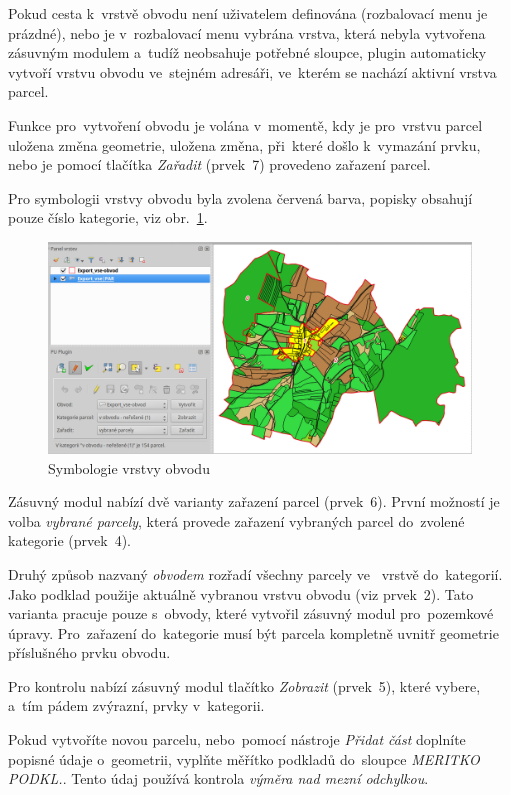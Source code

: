 Pokud cesta k~vrstvě obvodu není uživatelem definována (rozbalovací menu je prázdné), nebo je v~rozbalovací menu vybrána vrstva, která nebyla vytvořena zásuvným modulem a~tudíž neobsahuje potřebné sloupce, plugin automaticky vytvoří vrstvu obvodu ve~stejném adresáři, ve~kterém se nachází aktivní vrstva parcel.

Funkce pro~vytvoření obvodu je volána v~momentě, kdy je pro~vrstvu parcel uložena změna geometrie, uložena změna, při~které došlo k~vymazání prvku, nebo je pomocí tlačítka \textit{Zařadit} (prvek~7) provedeno zařazení parcel.

Pro symbologii vrstvy obvodu byla zvolena červená barva, popisky obsahují pouze číslo kategorie, viz obr.~\ref{fig:manual_symbologie_obvod}.

	\begin{figure}[H]
		\centering
		\includegraphics[width=1.0\textwidth]{./pictures/symbologie_obvod.png}
		\caption[Symbologie vrstvy obvodu]{Symbologie vrstvy obvodu}
		\label{fig:manual_symbologie_obvod}
 	\end{figure}

Zásuvný modul nabízí dvě varianty zařazení parcel (prvek~6). První možností je volba \textit{vybrané parcely}, která provede zařazení vybraných parcel do~zvolené kategorie (prvek~4).

Druhý způsob nazvaný \textit{obvodem} rozřadí všechny parcely ve~ vrstvě do~kategorií. Jako podklad použije aktuálně vybranou vrstvu obvodu (viz prvek~2). Tato varianta pracuje pouze s~obvody, které vytvořil zásuvný modul pro~pozemkové úpravy. Pro~zařazení do~kategorie musí být parcela kompletně uvnitř geometrie příslušného prvku obvodu.

Pro kontrolu nabízí zásuvný modul tlačítko \textit{Zobrazit} (prvek~5), které vybere, a~tím pádem zvýrazní, prvky v~kategorii.

Pokud vytvoříte novou parcelu, nebo~pomocí nástroje \textit{Přidat část} doplníte popisné údaje o~geometrii, vyplňte měřítko podkladů do~sloupce \textit{MERITKO PODKL.}. Tento údaj používá kontrola \textit{výměra nad mezní odchylkou}.

